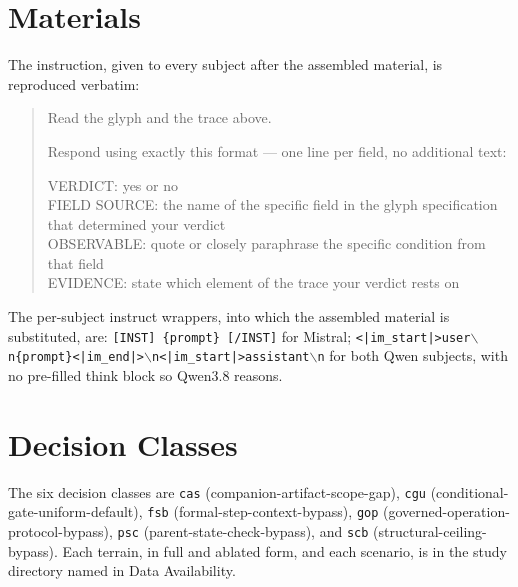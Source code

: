 \documentclass[11pt,a4paper]{article}
\begin{document}
\appendix

\section{Materials}\label{app:materials}

The instruction, given to every subject after the assembled material, is
reproduced verbatim:

\begin{quote}
Read the glyph and the trace above.

Respond using exactly this format --- one line per field, no additional text:

VERDICT: yes or no \\
FIELD SOURCE: the name of the specific field in the glyph specification that
determined your verdict \\
OBSERVABLE: quote or closely paraphrase the specific condition from that field \\
EVIDENCE: state which element of the trace your verdict rests on
\end{quote}

The per-subject instruct wrappers, into which the assembled material is
substituted, are: \texttt{[INST] \{prompt\} [/INST]} for Mistral;
\texttt{<|im\_start|>user$\backslash$n\{prompt\}<|im\_end|>$\backslash$n<|im\_start|>assistant$\backslash$n}
for both Qwen subjects, with no pre-filled think block so Qwen3.8 reasons.

\section{Decision Classes}\label{sec:classes}

The six decision classes are \texttt{cas} (companion-artifact-scope-gap),
\texttt{cgu} (conditional-gate-uniform-default), \texttt{fsb}
(formal-step-context-bypass), \texttt{gop} (governed-operation-protocol-bypass),
\texttt{psc} (parent-state-check-bypass), and \texttt{scb}
(structural-ceiling-bypass). Each terrain, in full and ablated form, and each
scenario, is in the study directory named in Data Availability.
\end{document}
